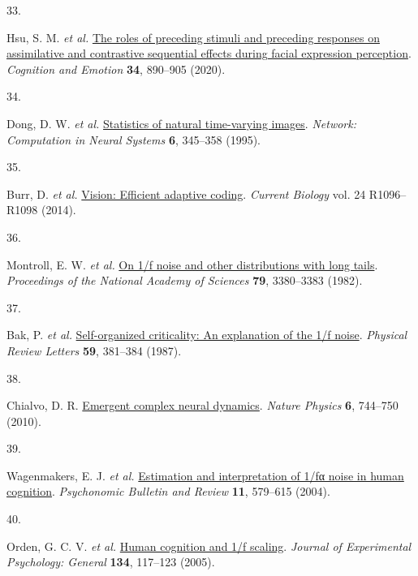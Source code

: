 \documentclass[
]{article}
\newlength{\cslhangindent}
\newlength{\csllabelwidth}
\newlength{\cslentryspacingunit} %
\newenvironment{CSLReferences}[2] %
 {%
  \setlength{\parindent}{0pt}
  \ifodd #1
  \let\oldpar\par
  \def\par{\hangindent=\cslhangindent\oldpar}
  \fi
  \setlength{\parskip}{#2\cslentryspacingunit}
 }%
 {}
\newcommand{\CSLLeftMargin}[1]{\parbox[t]{\csllabelwidth}{#1}}
\newcommand{\CSLRightInline}[1]{\parbox[t]{\linewidth - \csllabelwidth}{#1}\break}
\begin{document}
\begin{CSLReferences}{0}{0}
\leavevmode{}%
\CSLLeftMargin{33. }%
\CSLRightInline{Hsu, S. M. \emph{et al.}
\href{https://doi.org/10.1080/02699931.2019.1696752}{The roles of
preceding stimuli and preceding responses on assimilative and
contrastive sequential effects during facial expression perception}.
\emph{Cognition and Emotion} \textbf{34}, 890--905 (2020).}

\leavevmode{}%
\CSLLeftMargin{34. }%
\CSLRightInline{Dong, D. W. \emph{et al.}
\href{https://doi.org/10.1088/0954-898X_6_3_003}{Statistics of natural
time-varying images}. \emph{Network: Computation in Neural Systems}
\textbf{6}, 345--358 (1995).}

\leavevmode{}%
\CSLLeftMargin{35. }%
\CSLRightInline{Burr, D. \emph{et al.}
\href{https://doi.org/10.1016/j.cub.2014.10.002}{Vision: Efficient
adaptive coding}. \emph{Current Biology} vol. 24 R1096--R1098 (2014).}

\leavevmode{}%
\CSLLeftMargin{36. }%
\CSLRightInline{Montroll, E. W. \emph{et al.}
\href{https://doi.org/10.1073/pnas.79.10.3380}{On 1/f noise and other
distributions with long tails}. \emph{Proceedings of the National
Academy of Sciences} \textbf{79}, 3380--3383 (1982).}

\leavevmode{}%
\CSLLeftMargin{37. }%
\CSLRightInline{Bak, P. \emph{et al.}
\href{https://doi.org/10.1103/PhysRevLett.59.381}{Self-organized
criticality: An explanation of the 1/f noise}. \emph{Physical Review
Letters} \textbf{59}, 381--384 (1987).}

\leavevmode{}%
\CSLLeftMargin{38. }%
\CSLRightInline{Chialvo, D. R.
\href{https://doi.org/10.1038/nphys1803}{Emergent complex neural
dynamics}. \emph{Nature Physics} \textbf{6}, 744--750 (2010).}

\leavevmode{}%
\CSLLeftMargin{39. }%
\CSLRightInline{Wagenmakers, E. J. \emph{et al.}
\href{https://doi.org/10.3758/BF03196615}{Estimation and interpretation
of 1/fα noise in human cognition}. \emph{Psychonomic Bulletin and
Review} \textbf{11}, 579--615 (2004).}

\leavevmode{}%
\CSLLeftMargin{40. }%
\CSLRightInline{Orden, G. C. V. \emph{et al.}
\href{https://doi.org/10.1037/0096-3445.134.1.117}{Human cognition and
1/f scaling}. \emph{Journal of Experimental Psychology: General}
\textbf{134}, 117--123 (2005).}


\end{CSLReferences}
\end{document}

